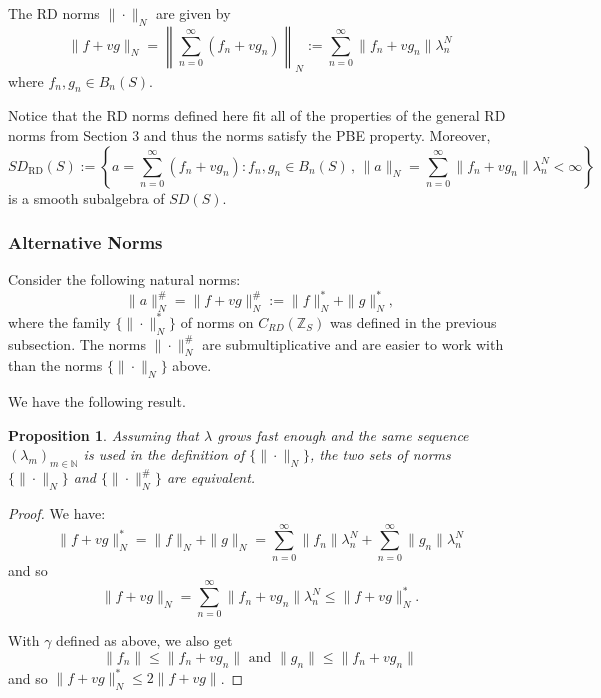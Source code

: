 \documentclass[12pt,reqno]{amsart}
\numberwithin{equation}{section}
\newcommand{\N}{{\mathbb N}}
\newcommand{\Z}{{\mathbb Z}}
\newtheorem{prop}[theo]{{\sc \bf Proposition}}
\begin{document}
The RD norms $\|\cdot\|_N$ are given by 
\begin{equation*}
\|f+vg\|_N = \left\|\sum_{n=0}^\infty (f_n+vg_n)\right\|_N := \sum_{n=0}^\infty \|f_n+vg_n\|\lambda_n^N
\end{equation*}
where $f_n,g_n\in B_n(S)$.


Notice that the RD norms defined here fit all of the properties of the general RD norms from Section 3 and thus the norms satisfy the PBE property. Moreover,
\begin{equation*}
SD_\textrm{RD}(S) := \left\{a=\sum_{n=0}^\infty (f_n+vg_n): f_n, g_n\in B_n(S)\,,\,\|a\|_N = \sum_{n=0}^\infty\|f_n+vg_n\|\lambda_n^N<\infty\right\}
\end{equation*}
is a smooth subalgebra of $SD(S)$.


\subsubsection{Alternative Norms}
Consider the following natural norms:
\begin{equation*}
\|a\|_N^{\#}=\|f+vg\|_N^{\#}:=\|f\|^*_N+\|g\|^*_N,
\end{equation*}
where the family $\{\|\cdot\|^*_N\}$ of norms on $C_{RD}(\Z_S)$ was defined in the previous subsection. The norms $\|\cdot\|^{\#}_N$ are submultiplicative and are easier to work with than the norms $\{\|\cdot\|_N\}$ above.

We have the following result.
\begin{prop} Assuming that $\lambda$ grows fast enough and the same sequence $(\lambda_m)_{m\in\N}$ is used in the definition of $\{\|\cdot\|_N\}$, the two sets of norms $\{\|\cdot\|_N\}$ and  $\{\|\cdot\|^{\#}_N\}$ are equivalent.
\end{prop}
\begin{proof}
We have:
\begin{equation*}
\|f+vg\|_N^* = \|f\|_N+\|g\|_N = \sum_{n=0}^\infty \|f_n\|\lambda_n^N + \sum_{n=0}^\infty \|g_n\|\lambda_n^N
\end{equation*}
and so 
$$\|f+vg\|_N = \sum_{n=0}^\infty \|f_n+vg_n\|\lambda_n^N \le \|f+vg\|_N^*.$$

With $\gamma$ defined as above, we also get 
\begin{equation*}
\|f_n\|\le \|f_n+vg_n\| \text{\ and\ } \|g_n\|\le \|f_n+vg_n\|
\end{equation*}
and so $\|f+vg\|_N^* \le 2\|f+vg\|$.
\end{proof}
\end{document}

